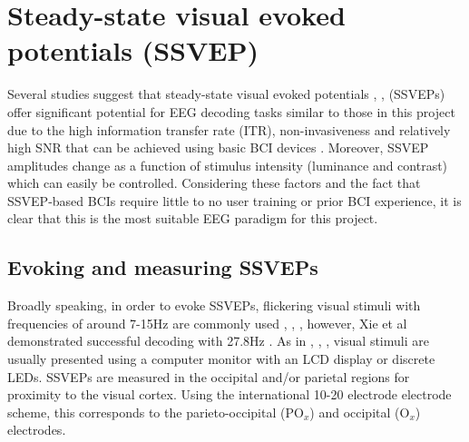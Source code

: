 \section{Steady-state visual evoked potentials (SSVEP)}
Several studies suggest that steady-state visual evoked potentials  \cite{Fernandez-Fraga2016}, \cite{Kanoga2020}, \cite{Acampora2021} (SSVEPs) offer significant potential for EEG decoding tasks similar to those in this project due to the high information transfer rate (ITR), non-invasiveness and relatively high SNR that can be achieved using basic BCI devices \cite{Zhu2021}. Moreover, SSVEP amplitudes change as a function of stimulus intensity (luminance and contrast) \cite{autthasan-single-chan-ssvep} which can easily be controlled. Considering these factors and the fact that SSVEP-based BCIs require little to no user training or prior BCI experience, it is clear that this is the most suitable EEG paradigm for this project. 

\subsection{Evoking and measuring SSVEPs}
\label{subsection:evoking-measuring-ssveps}

Broadly speaking, in order to evoke SSVEPs, flickering visual stimuli with frequencies of around 7-15Hz are commonly used \cite{Acampora2021}, \cite{Chen2017}, \cite{duart-comparing-ssvep-stimuli}, however, Xie et al demonstrated successful decoding with 27.8Hz \cite{Xie2016}. As in \cite{Acampora2021}, \cite{Chen2017}, \cite{autthasan-single-chan-ssvep}, visual stimuli are usually presented using a computer monitor with an LCD display or discrete LEDs. SSVEPs are measured in the occipital and/or parietal regions \cite{Fernandez-Fraga2016} for proximity to the visual cortex. Using the international 10-20 electrode electrode scheme, this corresponds to the parieto-occipital ($\text{PO}_x$) and occipital ($\text{O}_x$)  electrodes.

